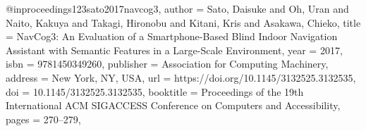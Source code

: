 @inproceedings{123sato2017navcog3,
author = {Sato, Daisuke and Oh, Uran and Naito, Kakuya and Takagi, Hironobu and Kitani, Kris and Asakawa, Chieko},
title = {NavCog3: An Evaluation of a Smartphone-Based Blind Indoor Navigation Assistant with Semantic Features in a Large-Scale Environment},
year = {2017},
isbn = {9781450349260},
publisher = {Association for Computing Machinery},
address = {New York, NY, USA},
url = {https://doi.org/10.1145/3132525.3132535},
doi = {10.1145/3132525.3132535},
booktitle = {Proceedings of the 19th International ACM SIGACCESS Conference on Computers and Accessibility},
pages = {270–279},
}